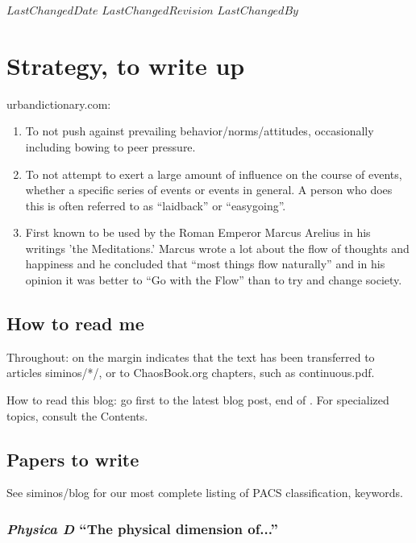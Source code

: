{$LastChangedDate$}
{$LastChangedRevision$} {$LastChangedBy$}


\chapter{Strategy, to write up}

{urbandictionary.com}:

\begin{enumerate}
   \item To not push against prevailing behavior/norms/attitudes, occasionally including bowing to peer pressure.

   \item To not attempt to exert a large amount of influence on the course of events, whether a specific series of events or events in general. A person who does this is often referred to as ``laidback'' or ``easygoing''.

   \item First known to be used by the Roman Emperor Marcus Arelius 
   in his writings 'the Meditations.' Marcus wrote a lot about the flow of thoughts and happiness and he concluded that ``most things flow naturally'' and in his opinion it was better to ``Go with the Flow'' than to try and change society.
 \end{enumerate}

\section{How to read me}

Throughout:  {\textdollar} on the margin
{\steady}
indicates that the text has been transferred to
articles siminos/*/,  or to ChaosBook.org
chapters, such as
{continuous.pdf}.

How to read this blog: go first to the latest blog post, end
of . For specialized topics, consult the
Contents.


\section{Papers to write}

See siminos/blog for our most complete listing of
PACS classification, keywords.

\subsection{\emph{Physica D} ``The physical dimension of...''}

